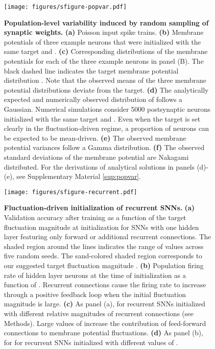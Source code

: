 \documentclass[11pt,a4paper]{article}
\begin{document}
\begin{refsection}
\begin{figure}[htb]
	\texttt{[image: figures/sfigure-popvar.pdf]}
\caption{\textbf{Population-level variability induced by random sampling of synaptic weights.}
	\textbf{(a)} Poisson input spike trains.
	\textbf{(b)} Membrane potentials  of three example neurons that were initialized with the same target  and .
	\textbf{(c)} Corresponding distributions of the membrane potentials  for each of the three example neurons in panel (B). The black dashed line indicates the target membrane potential distribution . Note that the observed means  of the three
membrane potential distributions deviate from the target.
\textbf{(d)} The analytically expected and numerically observed distribution of  follows a Gaussian. Numerical simulations consider 5000 postsynaptic neurons initialized with the same target  and . 
Even when the target is set clearly in the fluctuation-driven regime, a proportion of neurons can be expected to be mean-driven.
\textbf{(e)} The observed membrane potential variances  follow a Gamma distribution.
\textbf{(f)} The observed standard deviations of the membrane potential  are Nakagami distributed. For the derivations of analytical solutions in panels (d)-(e), see Supplementary Material \ref{sup:popvar}.
}
\label{sfig:popvar}
\end{figure}

\begin{figure}[htb]
	\texttt{[image: figures/sfigure-recurrent.pdf]}
\caption{
\textbf{Fluctuation-driven initialization of recurrent \acp{SNN}.}
	\textbf{(a)} Validation accuracy after training as a function of the target fluctuation magnitude  at initialization for \acp{SNN} with one hidden layer featuring only forward or additional recurrent connections. The shaded region around the lines indicates the range of values across five random seeds. The sand-colored shaded region corresponds to our suggested target fluctuation magnitude .
	\textbf{(b)} Population firing rate of hidden layer neurons at the time of initialization as a function of . Recurrent connections cause the firing rate to increase through a positive feedback loop when the initial fluctuation magnitude is large.
	\textbf{(c)} As panel (a), for recurrent \acp{SNN} initialized with different relative magnitudes of recurrent connections  (see Methods). Large values of  increase the contribution of feed-forward connections to membrane potential fluctuations. 
	\textbf{(d)} As panel (b), for for recurrent \acp{SNN} initialized with different values of .
}
\label{sfig:recurrent}
\end{figure}


\end{refsection}
\end{document}
